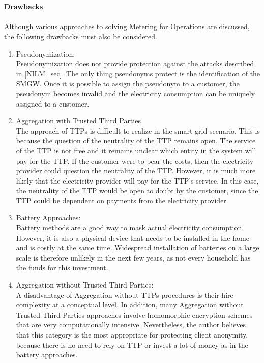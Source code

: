 \\
\\
\textbf{Drawbacks}
\\
\\
Although various approaches to solving Metering for Operations are discussed, the following drawbacks must also be considered.
\begin{enumerate}
\item Pseudonymization:\\
Pseudonymization does not provide protection against the attacks described in \ref{NILM_sec}. The only thing pseudonyms protect is the identification of the SMGW. Once it is possible to assign the pseudonym to a customer, the pseudonym becomes invalid and the electricity consumption can be uniquely assigned to a customer. 

\item Aggregation with Trusted Third Parties\\
The approach of TTPs is difficult to realize in the smart grid scenario. This is because the question of the neutrality of the TTP remains open. The service of the TTP is not free and it remains unclear which entity in the system will pay for the TTP. If the customer were to bear the costs, then the electricity provider could question the neutrality of the TTP. However, it is much more likely that the electricity provider will pay for the TTP's service. In this case, the neutrality of the TTP would be open to doubt by the customer, since the TTP could be dependent on payments from the electricity provider.

\item Battery Approaches:\\
Battery methods are a good way to mask actual electricity consumption. However, it is also a physical device that needs to be installed in the home and is costly at the same time. Widespread installation of batteries on a large scale is therefore unlikely in the next few years, as not every household has the funds for this investment.

\item Aggregation without Trusted Third Parties:\\
\label{subsec:aggegration_without_ttp}
A disadvantage of Aggregation without TTPs procedures is their hire complexity at a conceptual level. In addition, many Aggregation without Trusted Third Parties approaches involve homomorphic encryption schemes that are very computationally intensive. Nevertheless, the author believes that this category is the most appropriate for protecting client anonymity, because there is no need to rely on TTP or invest a lot of money as in the battery approaches.
\end{enumerate}
